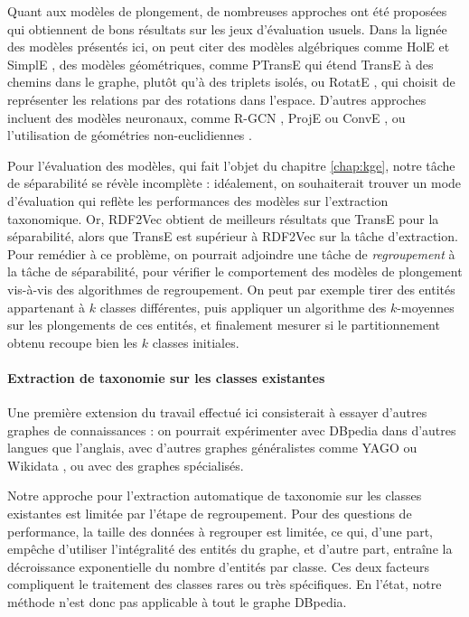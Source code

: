 Quant aux modèles de plongement, de nombreuses approches ont été proposées qui obtiennent de bons résultats sur les jeux d'évaluation usuels. Dans la lignée des modèles présentés ici, on peut citer des modèles algébriques comme HolE \cite{hole2016} et SimplE \cite{simple2018}, des modèles géométriques, comme PTransE \cite{ptranse} qui étend TransE à des chemins dans le graphe, plutôt qu'à des triplets isolés, ou RotatE \cite{rotate2019}, qui choisit de représenter les relations par des rotations dans l'espace. D'autres approches incluent des modèles neuronaux, comme R-GCN \cite{rgcn2018}, ProjE \cite{proje2017} ou ConvE \cite{conve2018}, ou l'utilisation de géométries non-euclidiennes \cite{nickel2017poincare, nickel2018learning}.

Pour l'évaluation des modèles, qui fait l'objet du chapitre \ref{chap:kge}, notre tâche de séparabilité se révèle incomplète : idéalement, on souhaiterait trouver un mode d'évaluation qui reflète les performances des modèles sur l'extraction taxonomique. Or, RDF2Vec obtient de meilleurs résultats que TransE pour la séparabilité, alors que TransE est supérieur à RDF2Vec sur la tâche d'extraction.  
Pour remédier à ce problème, on pourrait adjoindre une tâche de \textit{regroupement} à la tâche de séparabilité, pour vérifier le comportement des modèles de plongement vis-à-vis des algorithmes de regroupement. 
On peut par exemple tirer des entités appartenant à $k$ classes différentes, puis appliquer un algorithme des $k$-moyennes sur les plongements de ces entités, et finalement mesurer si le partitionnement obtenu recoupe bien les $k$ classes initiales.

\paragraph{Extraction de taxonomie sur les classes existantes}

Une première extension du travail effectué ici consisterait à essayer d'autres graphes de connaissances : on pourrait expérimenter avec DBpedia dans d'autres langues que l'anglais, avec d'autres graphes généralistes comme YAGO \cite{suchanek2008yago} ou Wikidata \cite{vrandevcic2014wikidata}, ou avec des graphes spécialisés.

Notre approche pour l'extraction automatique de taxonomie sur les classes existantes est limitée par l'étape de regroupement. Pour des questions de performance, la taille des données à regrouper est limitée, ce qui, d'une part, empêche d'utiliser l'intégralité des entités du graphe, et d'autre part, entraîne la décroissance exponentielle du nombre d'entités par classe. Ces deux facteurs compliquent le traitement des classes rares ou très spécifiques. En l'état, notre méthode n'est donc pas applicable à tout le graphe DBpedia.

